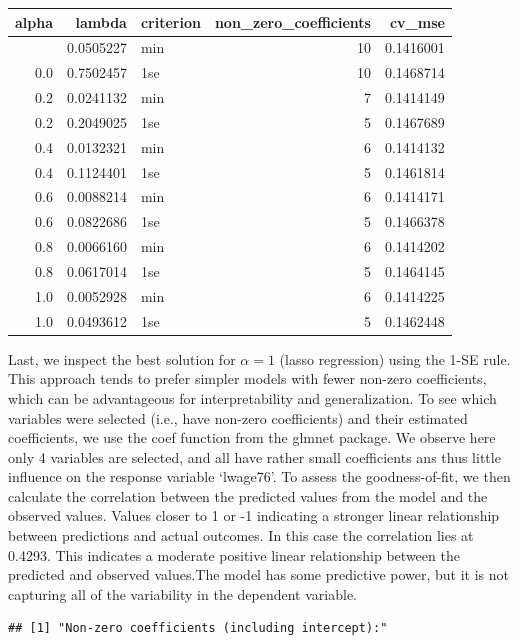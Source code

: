 \documentclass[
]{article}
\begin{document}
\begin{longtable}[]{@{}rrlrr@{}}
\toprule\noalign{}
alpha & lambda & criterion & non\_zero\_coefficients & cv\_mse \\
\midrule\noalign{}
\endhead
\bottomrule\noalign{}
\endlastfoot
0.0 & 0.0505227 & min & 10 & 0.1416001 \\
0.0 & 0.7502457 & 1se & 10 & 0.1468714 \\
0.2 & 0.0241132 & min & 7 & 0.1414149 \\
0.2 & 0.2049025 & 1se & 5 & 0.1467689 \\
0.4 & 0.0132321 & min & 6 & 0.1414132 \\
0.4 & 0.1124401 & 1se & 5 & 0.1461814 \\
0.6 & 0.0088214 & min & 6 & 0.1414171 \\
0.6 & 0.0822686 & 1se & 5 & 0.1466378 \\
0.8 & 0.0066160 & min & 6 & 0.1414202 \\
0.8 & 0.0617014 & 1se & 5 & 0.1464145 \\
1.0 & 0.0052928 & min & 6 & 0.1414225 \\
1.0 & 0.0493612 & 1se & 5 & 0.1462448 \\
\end{longtable}

Last, we inspect the best solution for \(\alpha = 1\) (lasso regression)
using the 1-SE rule. This approach tends to prefer simpler models with
fewer non-zero coefficients, which can be advantageous for
interpretability and generalization. To see which variables were
selected (i.e., have non-zero coefficients) and their estimated
coefficients, we use the coef function from the glmnet package. We
observe here only 4 variables are selected, and all have rather small
coefficients ans thus little influence on the response variable
`lwage76'. To assess the goodness-of-fit, we then calculate the
correlation between the predicted values from the model and the observed
values. Values closer to 1 or -1 indicating a stronger linear
relationship between predictions and actual outcomes. In this case the
correlation lies at 0.4293. This indicates a moderate positive linear
relationship between the predicted and observed values.The model has
some predictive power, but it is not capturing all of the variability in
the dependent variable.

\begin{verbatim}
## [1] "Non-zero coefficients (including intercept):"
\end{verbatim}
\end{document}
